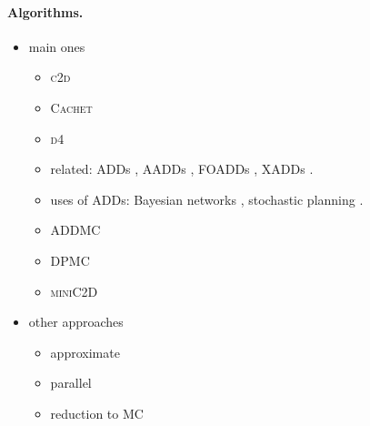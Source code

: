 \documentclass{article}
\begin{document}
\paragraph{Algorithms.}
\begin{itemize}
\item main ones
  \begin{itemize}
  \item \textsc{c2d} \cite{DBLP:conf/ecai/Darwiche04}
  \item \textsc{Cachet} \cite{DBLP:conf/sat/SangBBKP04,DBLP:conf/sat/SangBK05,DBLP:conf/aaai/SangBK05}
  \item \textsc{d4} \cite{DBLP:conf/ijcai/LagniezM17}
  \item related: ADDs \cite{DBLP:journals/fmsd/BaharFGHMPS97}, AADDs
    \cite{DBLP:conf/ijcai/SannerM05}, FOADDs \cite{DBLP:journals/ai/SannerB09},
    XADDs \cite{DBLP:conf/uai/SannerDB11}.
  \item uses of ADDs: Bayesian networks
    \cite{DBLP:conf/ijcai/ChaviraD07,DBLP:conf/uai/GogateD11}, stochastic
    planning \cite{DBLP:conf/uai/HoeySHB99}.
  \item \textsc{ADDMC} \cite{DBLP:conf/aaai/DudekPV20}
  \item \textsc{DPMC} \cite{DBLP:conf/cp/DudekPV20}
  \item \textsc{miniC2D} \cite{DBLP:conf/ijcai/OztokD15}
  \end{itemize}
\item other approaches
  \begin{itemize}
  \item approximate \cite{DBLP:conf/aaai/RenkensKBR14}
  \item parallel \cite{DBLP:conf/pgm/DalLL18}
  \item reduction to MC \cite{DBLP:conf/ijcai/ChakrabortyFMV15}
  \end{itemize}
\end{itemize}
\end{document}
